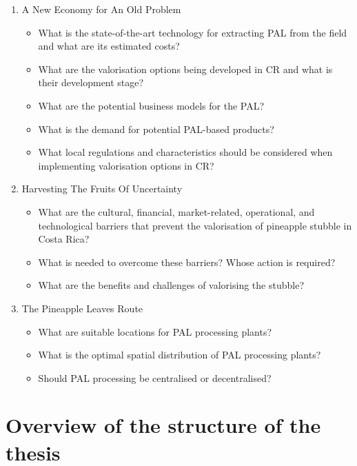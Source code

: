     
\begin{enumerate}

    \item A New Economy for An Old Problem
    \begin{itemize}
        \item What is the state-of-the-art technology for extracting PAL from the field and what are its estimated costs?
        \item What are the valorisation options being developed in CR and what is their development stage?
        \item What are the potential business models for the PAL?
        \item What is the demand for potential PAL-based products?
        \item What local regulations and characteristics should be considered when implementing valorisation options in CR?
    \end{itemize}
    
    \item Harvesting The Fruits Of Uncertainty
    \begin{itemize}
        \item What are the cultural, financial, market-related, operational, and technological barriers that prevent the valorisation of pineapple stubble in Costa Rica?
        \item What is needed to overcome these barriers? Whose action is required?
        \item What are the benefits and challenges of valorising the stubble?
    \end{itemize}
    
    \item The Pineapple Leaves Route
    \begin{itemize}
         \item What are suitable locations for PAL processing plants?
        \item What is the optimal spatial distribution of PAL processing plants? 
        \item Should PAL processing be centralised or decentralised? 
     \end{itemize}
    
\end{enumerate}

\section{Overview of the structure of the thesis}

